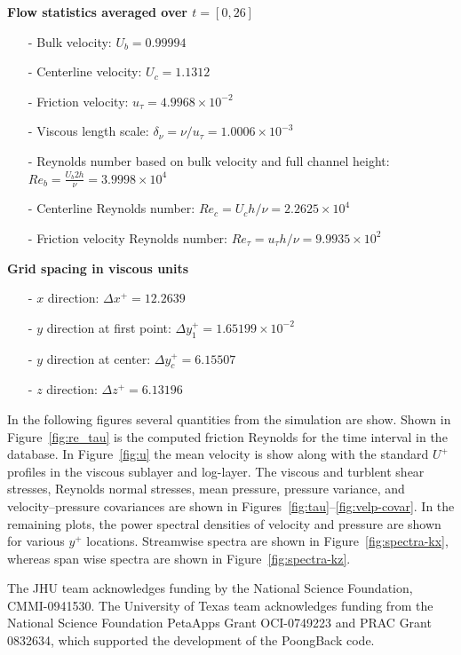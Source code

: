 \documentclass[11pt,letterpaper]{article}
\begin{document}
\vspace{1em}
\noindent \textbf{Flow statistics averaged over $t=[0,26]$}
\begin{itemize}
\itemsep0em
\item[-] Bulk velocity: $U_b = 0.99994$
\item[-] Centerline velocity: $U_c = 1.1312$
\item[-] Friction velocity: $u_\tau = 4.9968 \times 10^{-2}$
\item[-] Viscous length scale: $\delta_\nu = \nu/u_\tau = 1.0006 \times 10^{-3}$
\item[-] Reynolds number based on bulk velocity and full channel height: $Re_b=\frac{U_b 2h}{\nu} = 3.9998 \times 10^{4}$
\item[-] Centerline Reynolds number: $Re_c = U_c h / \nu= 2.2625 \times 10^{4}$
\item[-] Friction velocity Reynolds number: $Re_\tau = u_\tau h / \nu = 9.9935 \times 10^{2}$
\end{itemize}

\vspace{1em}
\noindent \textbf{Grid spacing in viscous units}
\begin{itemize}
\itemsep0em
\item[-] $x$ direction: $\Delta x^+ = 12.2639$
\item[-] $y$ direction at first point: $\Delta y_1^+ = 1.65199 \times 10^{-2}$
\item[-] $y$ direction at center: $\Delta y_c^+ = 6.15507$
\item[-] $z$ direction: $\Delta z^+ = 6.13196$
\end{itemize}

In the following figures several quantities from the simulation are show. Shown in Figure~\ref{fig:re_tau} is the computed friction Reynolds for the time interval in the database. In Figure~\ref{fig:u} the mean velocity is show along with the standard $U^+$ profiles in the viscous sublayer and log-layer. The viscous and turblent shear stresses, Reynolds normal stresses, mean pressure, pressure variance, and velocity--pressure covariances are shown in Figures~\ref{fig:tau}--\ref{fig:velp-covar}. In the remaining plots, the power spectral densities of velocity and pressure are shown for various $y^+$ locations. Streamwise spectra are shown in Figure~\ref{fig:spectra-kx}, whereas span wise spectra are shown in Figure~\ref{fig:spectra-kz}.

\vspace{0.4 cm}
 The JHU team acknowledges funding by the National Science Foundation, CMMI-0941530. The University of Texas team acknowledges funding from the National Science Foundation PetaApps Grant OCI-0749223 and PRAC Grant 0832634, which supported the development of the PoongBack code.
\end{document}
